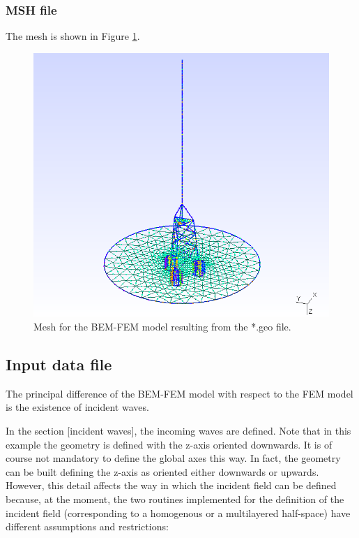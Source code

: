 \documentclass[a4]{article}
\begin{document}
\subsubsection{MSH file}

The mesh is shown in Figure \ref{fig:mesh2}.

\begin{figure}[h!]
	\centering
	\includegraphics[scale=0.6]{mesh2.png}
	\caption{Mesh for the BEM-FEM model resulting from the *.geo file.}
	\label{fig:mesh2}
\end{figure}

\subsection{Input data file}

The principal difference of the BEM-FEM model with respect to the FEM model is the existence of incident waves.

In the section [incident waves], the incoming waves are defined. Note that in this example the geometry is defined with the z-axis oriented downwards. It is of course not mandatory to define the global axes this way. In fact, the geometry can be built defining the z-axis as oriented either downwards or upwards. However, this detail affects the way in which the incident field can be defined because, at the moment, the two routines implemented for the definition of the incident field (corresponding to a homogenous or a multilayered half-space) have different assumptions and restrictions:
\end{document}
